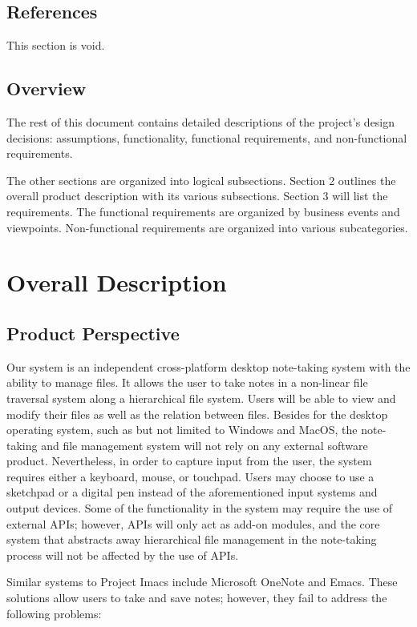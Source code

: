 \documentclass{article}
\begin{document}
\subsection{References}
This section is void.

\subsection{Overview}
The rest of this document contains detailed descriptions of the project's design decisions: assumptions, functionality, functional requirements, and non-functional requirements.

The other sections are organized into logical subsections. Section 2 outlines the overall product description with its various subsections. Section 3 will list the requirements. The functional requirements are organized by business events and viewpoints. Non-functional requirements are organized into various subcategories.

\section{Overall Description}
\subsection{Product Perspective}
Our system is an independent cross-platform desktop note-taking system with the ability to manage files. It allows the user to take notes in a non-linear file traversal system along a hierarchical file system. Users will be able to view and modify their files as well as the relation between files. Besides for the desktop operating system, such as but not limited to Windows and MacOS, the note-taking and file management system will not rely on any external software product. Nevertheless, in order to capture input from the user, the system requires either a keyboard, mouse, or touchpad. Users may choose to use a sketchpad or a digital pen instead of the aforementioned input systems and output devices. Some of the functionality in the system may require the use of external APIs; however, APIs will only act as add-on modules, and the core system that abstracts away hierarchical file management in the note-taking process will not be affected by the use of APIs.

Similar systems to Project Imacs include Microsoft OneNote and Emacs. These solutions allow users to take and save notes; however, they fail to address the following problems:
\end{document}
